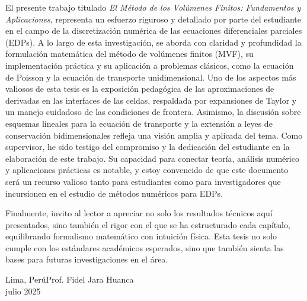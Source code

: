 %
%

\foreword

El presente trabajo titulado
\emph{El Método de los Volúmenes Finitos: Fundamentos y Aplicaciones},
representa un esfuerzo riguroso y detallado por parte del estudiante
en el campo de la discretización numérica de las ecuaciones
diferenciales parciales (EDPs).
A lo largo de esta investigación, se aborda con claridad y
profundidad la formulación matemática del método de volúmenes finitos
(MVF), su implementación práctica y su aplicación a problemas
clásicos, como la ecuación de Poisson y la ecuación de transporte
unidimensional.
Uno de los aspectos más valiosos de esta tesis es la exposición
pedagógica de las aproximaciones de derivadas en las interfaces de
las celdas, respaldada por expansiones de Taylor y un manejo
cuidadoso de las condiciones de frontera.
Asimismo, la discusión sobre esquemas lineales para la ecuación de
transporte y la extensión a leyes de conservación bidimensionales
refleja una visión amplia y aplicada del tema.
Como supervisor, he sido testigo del compromiso y la dedicación del
estudiante en la elaboración de este trabajo.
Su capacidad para conectar teoría, análisis numérico y aplicaciones
prácticas es notable, y estoy convencido de que este documento será
un recurso valioso tanto para estudiantes como para investigadores
que incursionen en el estudio de métodos numéricos para EDPs.

Finalmente, invito al lector a apreciar no solo los resultados
técnicos aquí presentados, sino también el rigor con el que se ha
estructurado cada capítulo, equilibrando formalismo matemático con
intuición física.
Esta tesis no solo cumple con los estándares académicos esperados,
sino que también sienta las bases para futuras investigaciones en el
área.

\vspace{\baselineskip}
\begin{flushright}\noindent
	Lima, Perú\hfill Prof. Fidel Jara Huanca\\
	julio 2025\hfill {\it\phantom{.}}
\end{flushright}


